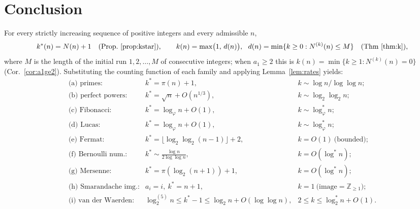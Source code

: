 \documentclass[12pt]{article}
\theoremstyle{definition}
\begin{document}
\section{Conclusion}

For every strictly increasing sequence of positive integers and every admissible $n$,
\[
  k^*(n)=N(n)+1\quad(\text{Prop.~\ref{prop:kstar}}),\qquad
  k(n)=\max\bigl(1,\,d(n)\bigr),\ \ d(n)=\min\{k\ge0:N^{(k)}(n)\le M\}\quad(\text{Thm~\ref{thm:k}}),
\]
where $M$ is the length of the initial run $1,2,\dots,M$ of consecutive integers;
when $a_1\ge2$ this is $k(n)=\min\{k\ge1:N^{(k)}(n)=0\}$
(Cor.~\ref{cor:a1ge2}). Substituting the counting function of each family and applying
Lemma~\ref{lem:rates} yields:
\[
\begin{array}{lll}
\text{(a) primes:} & k^*=\pi(n)+1, & k\sim \log n/\log\log n;\\
\text{(b) perfect powers:} & k^*=\sqrt n+O(n^{1/3}), & k\sim\log_2\log_2 n;\\
\text{(c) Fibonacci:} & k^*=\log_\varphi n+O(1), & k\sim\log^*_\varphi n;\\
\text{(d) Lucas:} & k^*=\log_\varphi n+O(1), & k\sim\log^*_\varphi n;\\
\text{(e) Fermat:} & k^*=\lfloor\log_2\log_2(n-1)\rfloor+2, & k=O(1)\ \text{(bounded)};\\
\text{(f) Bernoulli num.:} & k^*\sim \tfrac{\log n}{2\log\log n}, & k=O(\log^* n);\\
\text{(g) Mersenne:} & k^*=\pi(\log_2(n+1))+1, & k=O(\log^* n);\\
\text{(h) Smarandache img.:} & a_i=i,\ k^*=n+1, & k=1\ \text{(image}=\mathbb Z_{\ge1});\\
\text{(i) van der Waerden:} & \log^{(5)}_2 n\le k^*-1\le\log_2 n+O(\log\log n), & 2\le k\le\log^*_2 n+O(1).
\end{array}
\]
\end{document}
